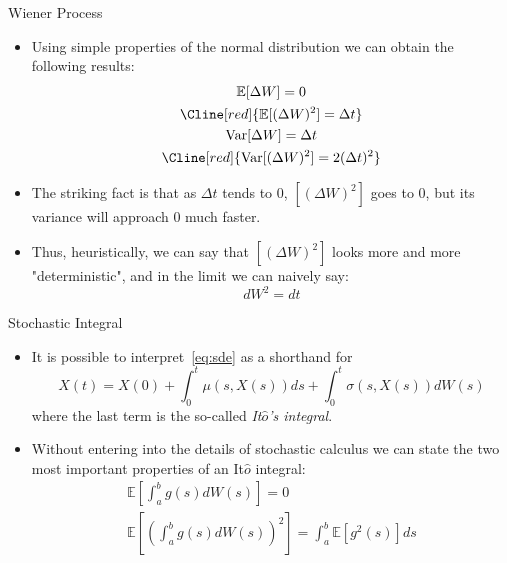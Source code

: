 \documentclass{beamer}
\begin{document}
\begin{frame}{Wiener Process}
	\begin{itemize}
		\item Using simple properties of the normal distribution we can obtain the following results:
			\begin{equation*}
				\begin{gathered}
					\mathbb{E}[\Delta W] = 0 \\
					\Cline[red]{\mathbb{E}[(\Delta W)^2] = \Delta t} \\
					\text{Var}[\Delta W] = \Delta t \\
					\Cline[red]{\text{Var}[(\Delta W)^2] = 2(\Delta t)^2} \\
				\end{gathered}
			\end{equation*}
		\item The striking fact is that as $\Delta t$ tends to 0, $[(\Delta W)^2]$ goes to 0, but its variance will approach 0 much faster.
		\item Thus, heuristically, we can say that $[(\Delta W)^2]$ looks more and more "deterministic", and in the limit we can naively say:
		\begin{equation*}
		\boxed{dW^2 = dt}
		\end{equation*}
	\end{itemize}
\end{frame}

\begin{frame}{Stochastic Integral}
	\begin{itemize}
		\item It is possible to interpret~\cref{eq:sde} as a shorthand for 
			\begin{equation*}
				X(t) = X(0) + \int_0^t \mu(s,X(s)) ds + \int_0^t \sigma(s,X(s)) dW(s)
			\end{equation*}
		where the last term is the so-called \emph{It$\hat{o}$'s integral}.
		\item Without entering into the details of stochastic calculus we can state the two most important properties of an It$\hat{o}$ integral:
			\begin{equation*}
				\begin{gathered}
					\mathbb{E}\left[\int_a^b g(s) dW(s)\right] = 0 \\
					\mathbb{E}\left[\left(\int_a^b g(s) dW(s)\right)^2\right] = \int_a^b\mathbb{E}[g^2(s)]ds\\
				\end{gathered}
			\end{equation*}
	\end{itemize}  
\end{frame}
\end{document}
